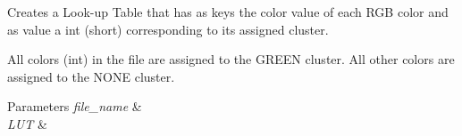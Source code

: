 Creates a Look-\/up Table that has as keys the color value of each R\+GB color and as value a int (short) corresponding to its assigned cluster. 

All colors (int) in the file are assigned to the G\+R\+E\+EN cluster. All other colors are assigned to the N\+O\+NE cluster. 
\begin{DoxyParams}{Parameters}
{\em file\+\_\+name} & \\
\hline
{\em L\+UT} & \\
\hline
\end{DoxyParams}
